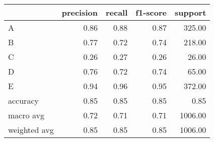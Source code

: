\begin{tabular}{|l|r|r|r|r|}
\hline
{} &  precision &  recall &  f1-score &  support \\
\hline
A            &       0.86 &    0.88 &      0.87 &   325.00 \\
B            &       0.77 &    0.72 &      0.74 &   218.00 \\
C            &       0.26 &    0.27 &      0.26 &    26.00 \\
D            &       0.76 &    0.72 &      0.74 &    65.00 \\
E            &       0.94 &    0.96 &      0.95 &   372.00 \\
accuracy     &       0.85 &    0.85 &      0.85 &     0.85 \\
macro avg    &       0.72 &    0.71 &      0.71 &  1006.00 \\
weighted avg &       0.85 &    0.85 &      0.85 &  1006.00 \\
\hline
\end{tabular}
